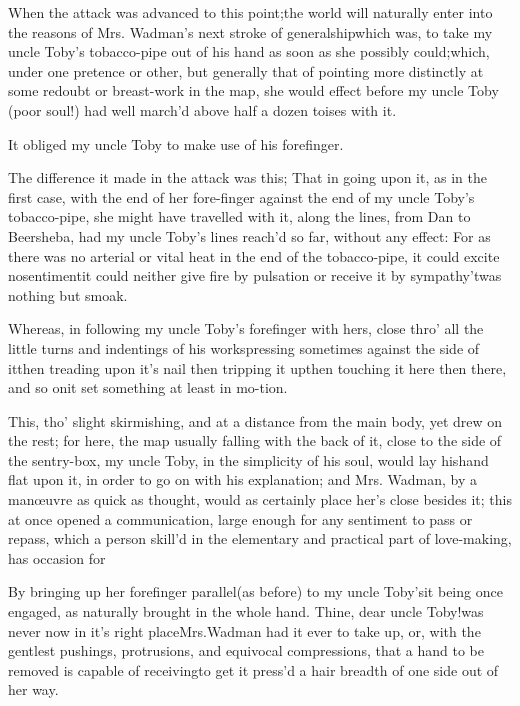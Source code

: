 \documentclass{article}
\begin{document}
When the attack was advanced to this point;\tsh the
world will naturally enter into the reasons of Mrs.
Wadman’s next stroke of generalship\tsh which
was, to take my uncle Toby’s tobacco-pipe out of his
hand as soon as she possibly could;\pb which, under one pretence or
other, but generally that of pointing more distinctly at some
redoubt or breast-work in the map, she would effect before my uncle
Toby (poor soul!) had well march’d above half a dozen
toises with it.

\tsk  It obliged my uncle Toby to make use of his
forefinger.

The difference it made in the attack was this; That in going upon it, as in the
first case, with the end of her fore-finger against the end of my uncle Toby’s
tobacco-pipe, she might have travelled with it, along the lines, from Dan to
Beersheba, had my uncle Toby’s lines reach’d so far, without any effect: For as
there was no arterial or vital heat in the end of the tobacco-pipe, it could excite
no\pb sentiment\tsh it could neither give fire by pulsation \tsh or receive it by
sympathy\break\null\tsh ’twas nothing but smoak.

Whereas, in following my uncle Toby’s forefinger
with hers, close thro’ all the little turns and indentings of
his works\tsh pressing sometimes against the side of
it\tsh then treading upon it's nail \tsh then
tripping it up\tsh then touching it here \tsh then
there, and so on\tsh it set something at least in
mo-\break tion.

This, tho’ slight skirmishing, and at a distance from the
main body, yet drew on the rest; for here, the map usually falling
with the back of it, close to the side of the sentry-box, my uncle
Toby, in the simplicity of his soul, would lay his\pb hand flat
upon it, in order to go on with his explanation; and Mrs.\@
Wadman, by a manœuvre as quick as thought, would as
certainly place her’s close besides it; this at once opened a
communication, large enough for any sentiment to pass or repass,
which a person skill’d in the elementary and practical part of love-making, has
occasion for\tsh

By bringing up her forefinger parallel\break (as before) to my uncle Toby’s\tsk it
being once engaged, as naturally brought in the whole hand. Thine, dear uncle
Toby!\@ was never now in it’s right place\break\tsh Mrs.\@ Wadman had it ever to
take up, or, with the gentlest pushings, protrusions, and equivocal compressions,\pb
that a hand to be removed is capable of receiving\tsh to get it press’d a hair
breadth of one side out of her way.
\end{document}
